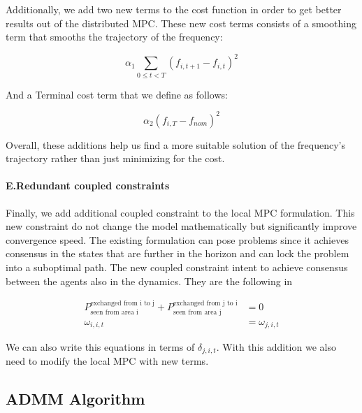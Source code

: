 \documentclass{article}
\begin{document}
Additionally, we add two new terms to the cost function in order to get better results out of the distributed MPC. These new cost terms consists of a smoothing term that smooths the trajectory of the frequency:

\begin{equation}
    \alpha_1 \sum_{0 \leq t < T}(f_{i,t+1} - f_{i,t})^2 
\end{equation}

And a Terminal cost term that we define as follows:

\begin{equation}
    \alpha_2 (f_{i,T} - f_{nom})^2 
\end{equation}

Overall, these additions help us find a more suitable solution of the frequency's trajectory rather than just minimizing for the cost.

\paragraph{E.Redundant coupled constraints} 

Finally, we add additional coupled constraint to the local MPC formulation. This new constraint do not change the model mathematically but significantly improve convergence speed. The existing formulation can pose problems since it achieves consensus in the states that are further in the horizon and can lock the problem into a suboptimal path. The new coupled constraint intent to achieve consensus between the agents also in the dynamics. They are the following in 

\begin{align}
    P_{\text{seen from area i}}^{\text{exchanged from i to j}} + P_{\text{seen from area j}}^{\text{exchanged from j to i}} &= 0 \\
    \omega_{i,i,t} &= \omega_{j,i,t}
\end{align}

We can also write this equations in terms of $\delta_{j,i,t}$. With this addition we also need to modify the local MPC with new terms. 

\subsection{ADMM Algorithm}
\end{document}
